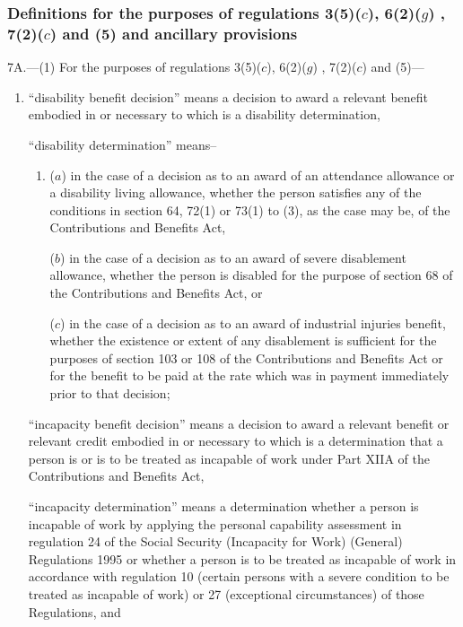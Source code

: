 \documentclass[12pt,a4paper]{article}
\begin{document}
\subsubsection[7A. Definitions for the purposes of regulations 3(5)($c$), 6(2)($g$)%
, 7(2)($c$) and (5)  %
and ancillary provisions]{Definitions for the purposes of regulations 3(5)($c$), 6(2)($g$)%
, 7(2)($c$) and (5)  %
and ancillary provisions}

7A.---(1)  For the purposes of regulations 3(5)($c$), 6(2)($g$)%
, 7(2)($c$) and (5)---  %
\begin{enumerate}\item[]
“disability benefit decision” means a decision to award a relevant benefit embodied in or necessary to which is a disability determination,

“disability determination” means–
\begin{enumerate}\item[]
($a$)
in the case of a decision as to an award of an attendance allowance or a disability living allowance, whether the person satisfies any of the conditions in section 64, 72(1) or 73(1) to (3), as the case may be, of the Contributions and Benefits Act,

($b$)
in the case of a decision as to an award of severe disablement allowance, whether the person is disabled for the purpose of section 68 of the Contributions and Benefits Act, or

($c$)
in the case of a decision as to an award of industrial injuries benefit, whether the existence or extent of any disablement is sufficient for the purposes of section 103 or 108 of the Contributions and Benefits Act or for the benefit to be paid at the rate which was in payment immediately prior to that decision;
\end{enumerate}

“incapacity benefit decision” means a decision to award a relevant benefit 
or relevant credit  %
embodied in or necessary to which is a determination that a person is or is to be treated as incapable of work under Part XIIA of the Contributions and Benefits Act,

\begin{sloppypar}
“incapacity determination” means a determination whether a person is incapable of work by applying the 
personal capability assessment  %
in regulation 24 of the Social Security (Incapacity for Work) (General) Regulations 1995 or whether a person is to be treated as incapable of work in accordance with regulation 10 (certain persons with a severe condition to be treated as incapable of work) or 27 (exceptional circumstances) of those Regulations, and
\end{sloppypar}


\end{enumerate}
\end{document}
